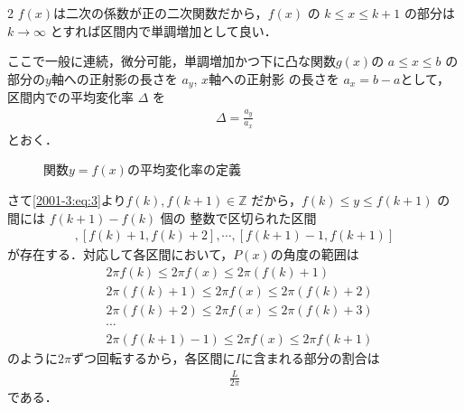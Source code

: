 \documentclass[../../../../main.tex]{subfiles}
\begin{document}
\begin{multicols}{2}
  $f(x)$は二次の係数が正の二次関数だから，$f(x)$ の $k \le x \le k+1$ の部分は$k \to \infty$ とすれば区間内で単調増加として良い．

  ここで一般に連続，微分可能，単調増加かつ下に凸な関数$g(x)$の
  $a \le x \le b$ の部分の$y$軸への正射影の長さを $a_y$, $x$軸への正射影
  の長さを $a_x=b-a$として，区間内での平均変化率 $\Delta$ を
  \begin{align}
    \Delta = \frac{a_y}{a_x} \label{2001-3:eq:4}
  \end{align}
  とおく．

  \begin{figure}[H]
    \centering
    \caption{関数$y=f(x)$の平均変化率の定義}
    \label{2001-3:fig:1}
  \end{figure}

  さて\cref{2001-3:eq:3}より$f(k), f(k+1) \in \mathbb{Z}$ だから，$f(k) \le y \le f(k+1)$ の間には $f(k+1)-f(k)$ 個の
  整数で区切られた区間
  \begin{align*}
    [f(k),f(k)+1], [f(k)+1,f(k)+2], \cdots, [f(k+1)-1,f(k+1)]
  \end{align*}
  が存在する．対応して各区間において，$P(x)$の角度の範囲は
  \begin{align*}
     & 2\pi f(k)     \le 2\pi f(x) \le 2\pi (f(k)+1) \\
     & 2\pi (f(k)+1) \le 2\pi f(x) \le 2\pi (f(k)+2) \\
     & 2\pi (f(k)+2) \le 2\pi f(x) \le 2\pi (f(k)+3) \\
     & \cdots                                        \\
     & 2\pi (f(k+1)-1) \le 2\pi f(x) \le 2\pi f(k+1)
  \end{align*}
  のように$2\pi$ずつ回転するから，各区間に$I$に含まれる部分の割合は
  \begin{align}
    \frac{L}{2\pi} \label{2001-3:eq:5}
  \end{align}
  である．


\end{multicols}
\end{document}
